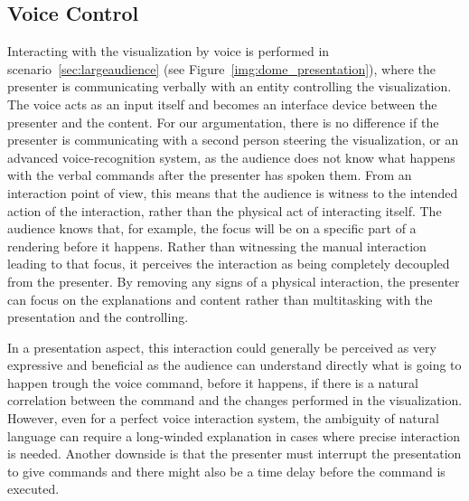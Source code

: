 \documentclass[review,journal]{vgtc}         %
\begin{document}
\subsection{Voice Control}

Interacting with the visualization by voice is performed in scenario~\ref{sec:largeaudience} (see Figure~\ref{img:dome_presentation}), where the presenter is communicating verbally with an entity controlling the visualization.
The voice acts as an input itself and becomes an interface device between the presenter and the content.
For our argumentation, there is no difference if the presenter is communicating with a second person steering the visualization, or an advanced voice-recognition system, as the audience does not know what happens with the verbal commands after the presenter has spoken them.
%
From an interaction point of view, this means that the audience is witness to the intended action of the interaction, rather than the physical act of interacting itself.
The audience knows that, for example, the focus will be on a specific part of a rendering before it happens.
Rather than witnessing the manual interaction leading to that focus, it perceives the interaction as being completely decoupled from the presenter.
By removing any signs of a physical interaction, the presenter can focus on the explanations and content rather than multitasking with the presentation and the controlling.

In a presentation aspect, this interaction could generally be perceived as very expressive and beneficial as the audience can understand directly what is going to happen trough the voice command, before it happens, if there is a natural correlation between the command and the changes performed in the visualization.
However, even for a perfect voice interaction system, the ambiguity of natural language can require a long-winded explanation in cases where precise interaction is needed. Another downside is that the presenter must interrupt the presentation to give commands and there might also be a time delay before the command is executed.
\end{document}
